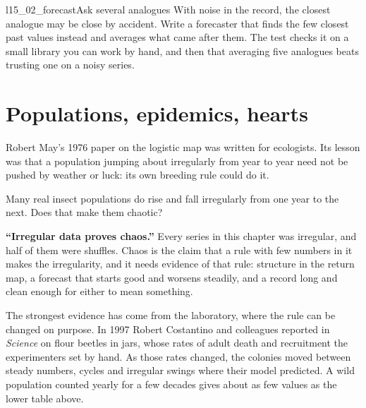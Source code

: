 \begin{lab}{l15_02_forecast}{Ask several analogues}
With noise in the record, the closest analogue may be close by accident.
Write a forecaster that finds the few closest past values instead and
averages what came after them. The test checks it on a small library you can
work by hand, and then that averaging five analogues beats trusting one on a
noisy series.
\end{lab}

\section{Populations, epidemics, hearts}
\label{sec:ch15-life}

\noindent
Robert May's 1976 paper on the logistic map was written for ecologists. Its
lesson was that a population jumping about irregularly from year to year
need not be pushed by weather or luck: its own breeding rule could do it.

\begin{think}
Many real insect populations do rise and fall irregularly from one year to
the next. Does that make them chaotic?
\end{think}

\begin{trapbox}
\textbf{\enquote{Irregular data proves chaos.}} Every series in this chapter
was irregular, and half of them were shuffles. Chaos is the claim that a rule
with few numbers in it makes the irregularity, and it needs evidence of that
rule: structure in the return map, a forecast that starts good and worsens
steadily, and a record long and clean enough for either to mean something.
\end{trapbox}

\noindent
The strongest evidence has come from the laboratory, where the rule can be
changed on purpose. In 1997 Robert Costantino and colleagues reported in
\emph{Science} on flour beetles in jars, whose rates of adult death and
recruitment the experimenters set by hand. As those rates changed, the
colonies moved between steady numbers, cycles and irregular swings where
their model predicted. A wild population counted yearly for a few decades
gives about as few values as the lower table above.


